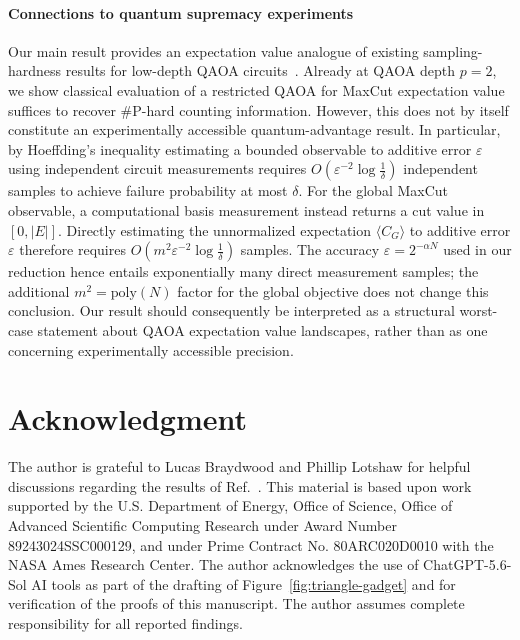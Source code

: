 \documentclass[11pt]{article}
\newcommand{\sh}[1]{{#1}}
\begin{document}
\paragraph{Connections to quantum supremacy experiments}
Our main result provides an %
expectation value analogue of existing sampling-hardness
results for low-depth QAOA  circuits~\cite{farhi2016quantum,harrow2017quantum,dalzell2020many}. %
Already at QAOA depth $p=2$, we show %
classical evaluation of a restricted QAOA for MaxCut expectation value %
suffices to recover
$\#\mathrm{P}$-hard counting information.
However, this does not by itself constitute an experimentally accessible
quantum-advantage result.  In particular, by Hoeffding's inequality estimating a bounded
observable to additive error $\varepsilon$ using independent circuit
measurements requires
$O(\varepsilon^{-2}\log\frac{1}{\delta})$
independent samples to achieve failure probability at most $\delta$.  
\sh{For the global MaxCut observable, a
computational basis measurement instead returns a cut value in
$[0,|E|]$.  Directly estimating the unnormalized
expectation $\langle C_G\rangle$ to additive error $\varepsilon$
therefore requires $O(
    m^2\varepsilon^{-2}\log\frac{1}{\delta}
  )$
samples.} 
The
accuracy $\varepsilon=2^{-\alpha N}$ used in our reduction %
hence entails exponentially many direct measurement samples; the additional
$m^2=\textrm{poly}(N)$ factor for the global objective does not change this
conclusion. 
Our result should consequently be interpreted as a structural
worst-case statement about %
QAOA
expectation value landscapes, rather than as %
one concerning 
experimentally accessible precision. %














\section*{Acknowledgment}
\sh{%
The author is grateful to Lucas Braydwood and Phillip Lotshaw for helpful discussions regarding the results of Ref.~\cite{WangEtAl2025}.} 
This material is based upon
work supported by the U.S. Department of Energy, Office of Science, Office of Advanced Scientific Computing Research under Award Number 89243024SSC000129, %
and under %
Prime Contract No. 80ARC020D0010 with the
NASA Ames Research Center. 
\sh{The author acknowledges the use of ChatGPT-5.6-Sol AI tools as part of the drafting of Figure~\ref{fig:triangle-gadget} and for verification of the proofs of this manuscript. %
The author assumes complete responsibility for all reported findings.} %
\end{document}
